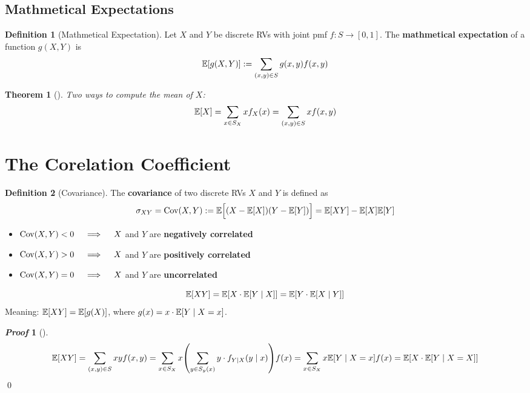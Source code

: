 \documentclass[10pt,UTF8]{article}
\newenvironment{definition box}
{\begin{tcolorbox}[colback=blue!5!white,colframe=blue!75!black,parbox=false,before upper=\par,before lower=\par]}
{\end{tcolorbox}}
\newenvironment{theorem box}
{\begin{tcolorbox}[colback=yellow!5!white,colframe=yellow!75!black,parbox=false,before upper=\par,before lower=\par]}
{\end{tcolorbox}}
\theoremstyle{definition}
\newtheorem{definition inner}{Definition}[section]
\newenvironment{definition}[1][]
{\begin{definition box}\begin{definition inner}[#1]\hfill\par}
{\end{definition inner}\end{definition box}}
\theoremstyle{plain}
\newtheorem{theorem inner}{Theorem}[section]
\newenvironment{theorem}[1][]
{\begin{theorem box}\begin{theorem inner}[#1]\hfill\par}
{\end{theorem inner}\end{theorem box}}
\theoremstyle{definition}
\newtheorem*{proof inner}{\textit{Proof}}
\renewenvironment{proof}[1][]
{\begin{proof inner}[#1]\hfill\par}
{\qed\end{proof inner}}
\theoremstyle{remark}
\newcommand{\E}[1]{\mathbb{E}\qty[#1]}  %
\newcommand{\Cov}{\mathrm{Cov}\qty}  %
\begin{document}
\subsection{Mathmetical Expectations}

\begin{definition}[Mathmetical Expectation]
    Let $X$ and $Y$ be discrete RVs with joint pmf $f\colon S\rightarrow [0,1]$.
    The \textbf{mathmetical expectation} of a function $g(X,Y)$ is
    \begin{equation*}
        \E{g(X,Y)} := \sum_{(x,y)\in S}g(x,y)f(x,y)
    \end{equation*}
\end{definition}

\begin{theorem}
    Two ways to compute the mean of $X$:
    \begin{equation*}
        \E{X} = \sum_{x\in S_X}x f_X(x)
        = \sum_{(x,y)\in S}x f(x,y)
    \end{equation*}
\end{theorem}


\section{The Corelation Coefficient}

\begin{definition}[Covariance]
    The \textbf{covariance} of two discrete RVs $X$ and $Y$ is defined as
    \begin{equation*}
        \sigma_{X Y} = \Cov(X,Y) := \E{(X-\E{X})(Y-\E{Y})\vphantom{\Big|}}
        = \E{X Y} - \E{X}\E{Y}
    \end{equation*}
    \begin{itemize}
        \item $\Cov(X,Y)<0\quad\implies\quad X$ and $Y$ are \textbf{negatively correlated}
        \item $\Cov(X,Y)>0\quad\implies\quad X$ and $Y$ are \textbf{positively correlated}
        \item $\Cov(X,Y)=0\quad\implies\quad X$ and $Y$ are \textbf{uncorrelated}
    \end{itemize}
\end{definition}

\begin{theorem box}
    \begin{equation*}
        \E{X Y} = \E{X\cdot\E{Y\mid X}}
        = \E{Y\cdot\E{X\mid Y}}
    \end{equation*}
    Meaning: $\E{X Y} = \E{g(X)}$, where $g(x) = x\cdot\E{Y\mid X=x}$.
\end{theorem box}
\begin{proof}
    \begin{equation*}
        \E{X Y} = \sum_{(x,y)\in S} x y f(x,y)
        = \sum_{x\in S_X} x \qty(\sum_{y\in S_y(x)} y\cdot f_{Y|X}(y\mid x))f(x)
        = \sum_{x\in S_X} x\E{Y\mid X=x} f(x)
        = \E{X\cdot\E{Y\mid X=X}}
    \end{equation*}
\end{proof}
\end{document}
